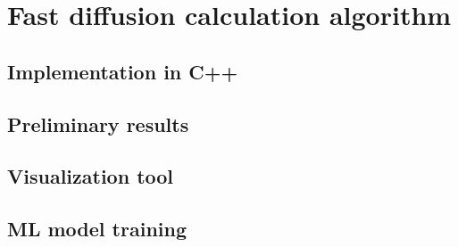 \documentclass[main]{subfiles}
\begin{document}
\section{Fast diffusion calculation algorithm}

\subsection{Implementation in C++}

\subsection{Preliminary results}

\subsection{Visualization tool}

\subsection{ML model training}

\OnlyInSubfile{\printglobalbibliography}
\end{document}

